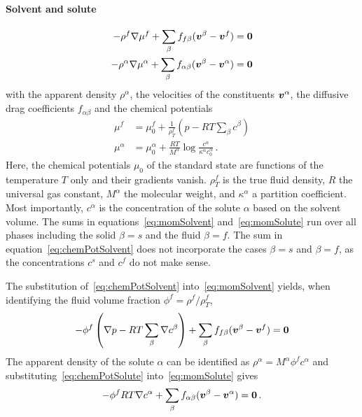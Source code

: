 \documentclass[a4paper,DIV=12,10pt]{scrartcl}
\newcommand{\V}[0]{\vek{v}}
\begin{document}
\paragraph{Solvent and solute}
\begin{align}
  \label{eq:momSolvent}
  - \rho^f \nabla \mu^f + \sum_{\beta} f_{f \beta} (\V^\beta  - \V^f) &=
  \vek{0} \\
  \label{eq:momSolute}
  - \rho^\alpha \nabla \mu^\alpha + \sum_{\beta} f_{\alpha \beta} (\V^\beta
  - \V^\alpha) &=  \vek{0} 
\end{align}
with the apparent density $\rho^\alpha$, the velocities of the constituents
$\V^\alpha$, the diffusive drag coefficients $f_{\alpha \beta}$ and the
chemical potentials
\begin{align}
  \label{eq:chemPotSolvent}
  \mu^f &= \mu^f_0 + \frac{1}{\rho^f_T} \left( p - RT \sum_{\beta}
    c^\beta \right)\\
  \label{eq:chemPotSolute}
  \mu^\alpha &= \mu^\alpha_0 + \frac{RT}{M^\alpha} \log
  \frac{c^\alpha}{\kappa^\alpha c^\alpha_0}\,.
\end{align}
Here, the chemical potentials $\mu_0$ of the standard state are functions of
the temperature $T$ only and their gradients vanish. $\rho^f_T$ is the true
fluid density, $R$ the universal gas constant, $M^\alpha$ the molecular
weight, and $\kappa^\alpha$ a partition coefficient. Most importantly, 
$c^\alpha$ is the concentration of the solute $\alpha$ based on the solvent
volume. 
The sums in equations~\eqref{eq:momSolvent} and~\eqref{eq:momSolute} run over
all phases including the solid $\beta = s$ and the fluid $\beta = f$. The sum
in equation~\eqref{eq:chemPotSolvent} does not incorporate the cases $\beta
= s$ and $\beta =f$, as the concentrations $c^s$ and $c^f$ do not make sense.


The substitution of~\eqref{eq:chemPotSolvent} into~\eqref{eq:momSolvent}
yields, when identifying the fluid volume fraction $\phi^f = \rho^f /
\rho^f_T$, 
\begin{equation}
  - \phi^f \left( \nabla p - RT \sum_{\beta} \nabla c^\beta \right) +
  \sum_{\beta} f_{f\beta} (\V^\beta - \V^f) = \vek{0}
\end{equation}
The apparent density of the solute $\alpha$ can be identified as 
$\rho^\alpha = M^\alpha \phi^f c^\alpha$ and
substituting~\eqref{eq:chemPotSolute} into~\eqref{eq:momSolute} gives
\begin{equation}
  - \phi^f RT \nabla c^\alpha + \sum_{\beta} f_{\alpha \beta} 
  (\V^\beta -  \V^\alpha) = \vek{0} \,.
\end{equation}
\end{document}
